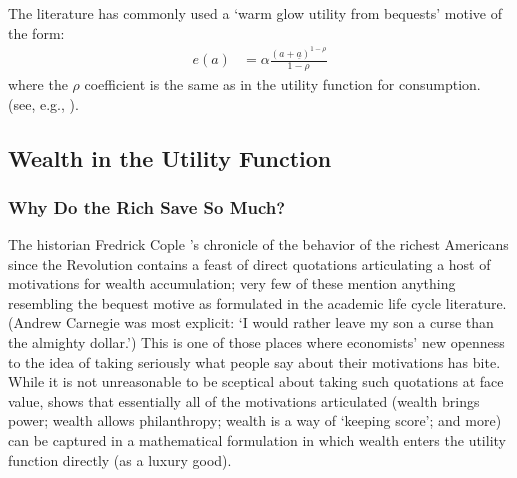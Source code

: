 \documentclass{article}
\newcommand{\CRRA}{\rho}
\newcommand{\bqstNrm}{e}
\begin{document}
The literature has commonly used a `warm glow utility from bequests' motive of the form:
\begin{align}
    \bqstNrm(a) & = \alpha\frac{(a+\underline{a})^{1-\CRRA}}{1-\CRRA}
\end{align}
where the $\CRRA$ coefficient is the same as in the utility function for consumption.
(see, e.g., \cite{deNardiBequest}).



\subsection{Wealth in the Utility Function}

\subsubsection{Why Do the Rich Save So Much?}

The historian Fredrick Cople \cite{jaherGilded}'s chronicle of the behavior of the richest Americans since the Revolution contains a feast of direct quotations articulating a host of motivations for wealth accumulation; very few of these mention anything resembling the bequest motive as formulated in the academic life cycle literature.  (Andrew Carnegie was most explicit: `I would rather leave my son a curse than the almighty dollar.')  This is one of those places where economists' new openness to the idea of taking seriously what people say about their motivations has bite. While it is not unreasonable to be sceptical about taking such quotations at face value, \cite{WhyDoTheRich} shows that essentially all of the motivations articulated (wealth brings power; wealth allows philanthropy; wealth is a way of `keeping score'; and more) can be captured in a mathematical formulation in which wealth enters the utility function directly (as a luxury good).
\end{document}
